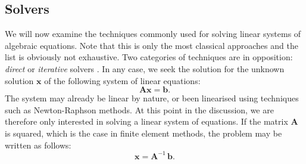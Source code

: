 
		
	\subsection{Solvers}	\label{chap3:solvers}
We will now examine the techniques commonly used for solving linear systems of algebraic equations. Note that this is only the most classical approaches and the list is obviously not exhaustive. Two categories of techniques are in opposition: \emph{direct} or \emph{iterative} solvers \citep{Press02}. In any case, we seek the solution for the unknown solution $ \mathbf{x}$ of the following system of linear equations:
\begin{equation}
\label{chap3:linearEquation}
\mathbf{A} \mathbf{x} = \mathbf{b}.
\end{equation}
The system may already be linear by nature, or been linearised using techniques such as Newton-Raphson methods. At this point in the discussion, we are therefore only interested in solving a linear system of equations. If the matrix $ \mathbf{A} $ is squared, which is the case in finite element methods, the problem may be written as follows:
\begin{equation}
\mathbf{x} = \mathbf{A}^{-1} \, \mathbf{b}.
\end{equation}

